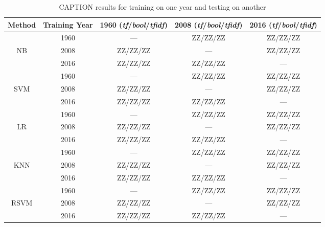 \documentclass[aps, prl, reprint, showpacs]{revtex4-1}
\begin{document}
\begin{table*} %
  \begin{ruledtabular}
  \begin{tabular}{ccccc}
   Method & Training Year & 1960 (\textit{tf}/\textit{bool}/\textit{tfidf}) & 2008 (\textit{tf}/\textit{bool}/\textit{tfidf}) & 2016 (\textit{tf}/\textit{bool}/\textit{tfidf}) \\
    \hline
 & 1960 & ---  & ZZ/ZZ/ZZ & ZZ/ZZ/ZZ \\
NB & 2008 & ZZ/ZZ/ZZ  & --- & ZZ/ZZ/ZZ \\
 & 2016 & ZZ/ZZ/ZZ  & ZZ/ZZ/ZZ & --- \\
 \hline
  & 1960 & ---  & ZZ/ZZ/ZZ & ZZ/ZZ/ZZ \\
SVM & 2008 & ZZ/ZZ/ZZ  & --- & ZZ/ZZ/ZZ \\
 & 2016 & ZZ/ZZ/ZZ  & ZZ/ZZ/ZZ & --- \\
 \hline
  & 1960 & ---  & ZZ/ZZ/ZZ & ZZ/ZZ/ZZ \\
LR & 2008 & ZZ/ZZ/ZZ  & --- & ZZ/ZZ/ZZ \\
 & 2016 & ZZ/ZZ/ZZ  & ZZ/ZZ/ZZ & --- \\
 \hline
  & 1960 & ---  & ZZ/ZZ/ZZ & ZZ/ZZ/ZZ \\
KNN & 2008 & ZZ/ZZ/ZZ  & --- & ZZ/ZZ/ZZ \\
 & 2016 & ZZ/ZZ/ZZ  & ZZ/ZZ/ZZ & --- \\
 \hline
  & 1960 & ---  & ZZ/ZZ/ZZ & ZZ/ZZ/ZZ \\
RSVM & 2008 & ZZ/ZZ/ZZ  & --- & ZZ/ZZ/ZZ \\
 & 2016 & ZZ/ZZ/ZZ  & ZZ/ZZ/ZZ & --- \\
 \hline
  \end{tabular}
  \end{ruledtabular}
    \caption{CAPTION results for training on one year and testing on another}
     \label{tab:results}
\end{table*}
\end{document}
